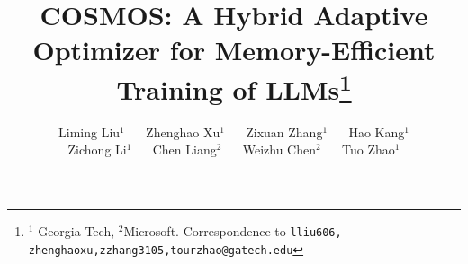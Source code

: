 \documentclass[11pt]{article} %
\title{\huge COSMOS: A Hybrid Adaptive Optimizer for Memory-Efficient Training of LLMs\thanks{$^1$ Georgia Tech, $^2$Microsoft.  Correspondence to \texttt{lliu606, zhenghaoxu,zzhang3105,tourzhao@gatech.edu}}}
\author{Liming Liu$^1$ ~~ Zhenghao Xu$^1$ ~~ Zixuan Zhang$^1$ ~~ Hao Kang$^1$\\Zichong Li$^1$ ~~ Chen Liang$^2$ ~~ Weizhu Chen$^2$ ~~ Tuo Zhao$^1$
}
\date{}
\begin{document}
\maketitle


\begin{abstract}

\end{abstract}










\newpage
\appendix

\end{document}
